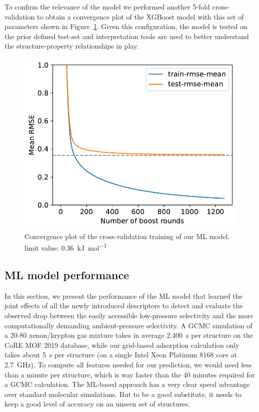 \documentclass[main]{subfiles}
\begin{document}
To confirm the relevance of the model we performed another 5-fold cross-validation to obtain a convergence plot of the XGBoost model with this set of parameters shown in Figure~\ref{fgr:convplot}. Given this configuration, the model is tested on the prior defined test-set and interpretation tools are used to better understand the structure-property relationships in play.

\begin{figure}[ht]
  \centering
    \includegraphics[width=0.60\linewidth]{figures/4-ml/SI_figure/convergence_plot.pdf}
    \caption{Convergence plot of the cross-validation training of our ML model. limit value: 0.36~\si{\kilo\joule\per\mole}}\label{fgr:convplot}
  \end{figure}

\subsection{ML model performance}

In this section, we present the performance of the ML model that learned the joint effects of all the newly introduced descriptors to detect and evaluate the observed drop between the easily accessible low-pressure selectivity and the more computationally demanding ambient-pressure selectivity.
A GCMC simulation of a 20-80 xenon/krypton gas mixture takes in average \SI{2,400}{\second} per structure on the CoRE MOF 2019 database, while our grid-based adsorption calculation only takes about \SI{5}{\second} per structure (on a single Intel Xeon Platinum 8168 core at \SI{2.7}{\giga\hertz}). To compute all features needed for our prediction, we would need less than a minute per structure, which is way faster than the 40 minutes required for a GCMC calculation. The ML-based approach has a very clear speed advantage over standard molecular simulations. But to be a good substitute, it needs to keep a good level of accuracy on an unseen set of structures.
\end{document}
